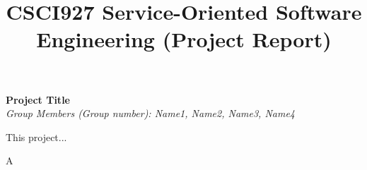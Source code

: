 \documentclass[runningheads]{llncs}
\begin{document}
\title{\large{CSCI927 Service-Oriented Software Engineering (Project Report)}}
\author{}
\institute{}
\maketitle
\vspace{-1cm}



\begin{center}
\Large{\textbf{Project Title}} \\ %
\vspace{0.2cm}
\large{\emph{Group Members (Group number): Name1, Name2, Name3, Name4}} \\%
\vspace{0.3cm}
\end{center}

\noindent This project...


A
\end{document}
